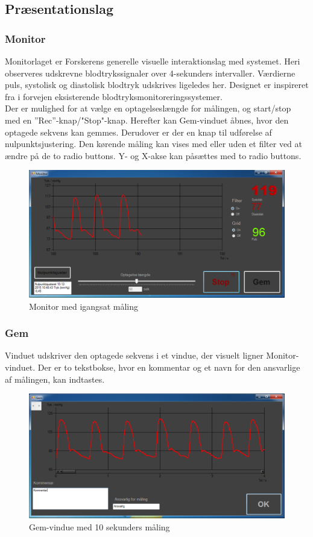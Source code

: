 \subsection{Præsentationslag}

\subsubsection{Monitor}
Monitorlaget er Forskerens generelle visuelle interaktionslag med systemet. Heri observeres udskrevne blodtrykssignaler over 4-sekunders intervaller. Værdierne puls, systolisk og diastolisk blodtryk udskrives ligeledes her. Designet er inspireret fra i forvejen eksisterende blodtryksmonitoreringssystemer. \\
Der er mulighed for at vælge en optagelseslængde for målingen, og start/stop med en ”Rec”\--knap/"Stop"\--knap. Herefter kan Gem-vinduet åbnes, hvor den optagede sekvens kan gemmes. Derudover er der en knap til udførelse af nulpunktsjustering. Den kørende måling kan vises med eller uden et filter ved at ændre på de to radio buttons. Y- og X-akse kan påsættes med to radio buttons. 
\begin{figure}[H]
	\centering
	\includegraphics[width=1\textwidth]{Figurer/Monitor_vindue_Recording}
	\caption{Monitor med igangsat måling}
\end{figure}

\subsubsection{Gem}
Vinduet udskriver den optagede sekvens i et vindue, der visuelt ligner Monitor-vinduet. Der er to tekstbokse, hvor en kommentar og et navn for den ansvarlige af målingen, kan indtastes.
\begin{figure}[H]
	\centering
	\includegraphics[width=1\textwidth]{Figurer/Gem}
	\caption{Gem-vindue med 10 sekunders måling}
\end{figure}


